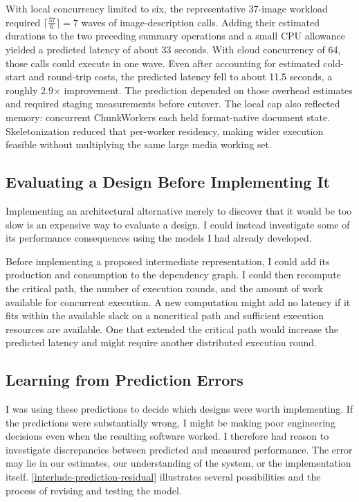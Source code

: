 With local concurrency limited to six, the representative 37-image workload required \(\lceil \frac{37}{6}\rceil=7\) waves of image-description calls. Adding their estimated durations to the two preceding summary operations and a small CPU allowance yielded a predicted latency of about 33 seconds. With cloud concurrency of 64, those calls could execute in one wave. Even after accounting for estimated cold-start and round-trip costs, the predicted latency fell to about 11.5 seconds, a roughly 2.9× improvement. The prediction depended on those overhead estimates and required staging measurements before cutover. The local cap also reflected memory: concurrent ChunkWorkers each held format-native document state. Skeletonization reduced that per-worker residency, making wider execution feasible without multiplying the same large media working set.

\subsection{Evaluating a Design Before Implementing It}\label{heading:predicting-the-cost-of-a-design-change}

Implementing an architectural alternative merely to discover that it would be too slow is an expensive way to evaluate a design. I could instead investigate some of its performance consequences using the models I had already developed.

Before implementing a proposed intermediate representation, I could add its production and consumption to the dependency graph. I could then recompute the critical path, the number of execution rounds, and the amount of work available for concurrent execution. A new computation might add no latency if it fits within the available slack on a noncritical path and sufficient execution resources are available. One that extended the critical path would increase the predicted latency and might require another distributed execution round.


\subsection{Learning from Prediction Errors}\label{heading:use-prediction-error-as-evidence}

I was using these predictions to decide which designs were worth implementing. If the predictions were substantially wrong, I might be making poor engineering decisions even when the resulting software worked. I therefore had reason to investigate discrepancies between predicted and measured performance. The error may lie in our estimates, our understanding of the system, or the implementation itself. \autoref{interlude-prediction-residual} illustrates several possibilities and the process of revising and testing the model.

